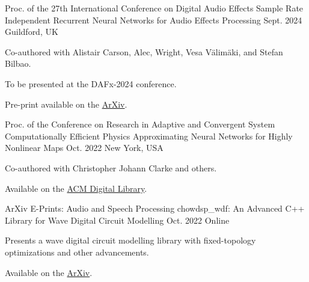 

\begin{cventries}

  \cventry
    {Proc. of the 27th International Conference on Digital Audio Effects} %
    {Sample Rate Independent Recurrent Neural Networks for Audio Effects Processing} %
    {Sept. 2024} %
    {Guildford, UK} %
    {
      \begin{cvitems} %
        \item {Co-authored with Alistair Carson, Alec, Wright, Vesa Välimäki, and Stefan Bilbao.}
        \item {To be presented at the DAFx-2024 conference.}
        \item {Pre-print available on the \href{https://arxiv.org/pdf/2406.06293}{ArXiv}.}
      \end{cvitems}
    }

  \cventry
    {Proc. of the Conference on Research in Adaptive and Convergent System} %
    {Computationally Efficient Physics Approximating Neural Networks for Highly Nonlinear Maps} %
    {Oct. 2022} %
    {New York, USA} %
    {
      \begin{cvitems} %
        \item {Co-authored with Christopher Johann Clarke and others.}
        \item {Available on the \href{https://dl.acm.org/doi/10.1145/3538641.3561501}{ACM Digital Library}.}
      \end{cvitems}
    }

  \cventry
    {ArXiv E-Prints: Audio and Speech Processing} %
    {chowdsp\_wdf: An Advanced C++ Library for Wave Digital Circuit Modelling} %
    {Oct. 2022} %
    {Online} %
    {
      \begin{cvitems} %
        \item {Presents a wave digital circuit modelling library with fixed-topology optimizations and other advancements.}
        \item {Available on the \href{https://arxiv.org/abs/2210.12554}{ArXiv}.}
      \end{cvitems}
    }



\end{cventries}
